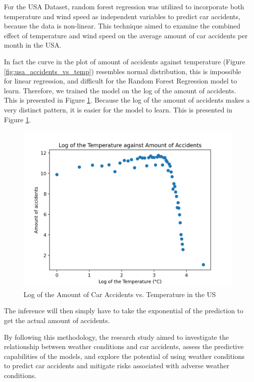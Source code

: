\documentclass{article}
\begin{document}
For the USA Dataset, random forest regression \cite{random_forest_regression} was utilized to incorporate both temperature and wind speed as independent variables to predict car accidents, because the data is non-linear. This technique aimed to examine the combined effect of temperature and wind speed on the average amount of car accidents per month in the USA.

In fact the curve in the plot of amount of accidents against temperature (Figure \ref{fig:usa_accidents_vs_temp}) resembles normal distribution, this is impossible for linear regression, and difficult for the Random Forest Regression model to learn. Therefore, we trained the model on the log of the amount of accidents. This is presented in Figure \ref{fig:usa_log_accidents_vs_temp}. Because the log of the amount of accidents makes a very distinct pattern, it is easier for the model to learn. This is presented in Figure \ref{fig:usa_log_accidents_vs_temp}.

\begin{figure}[h!]
    \centering
    \includegraphics[scale=0.5]{../figures/highres/log_temperature_against_amount_of_accidents.png}
    \caption{Log of the Amount of Car Accidents vs. Temperature in the US}
    \label{fig:usa_log_accidents_vs_temp}
\end{figure}

The inference will then simply have to take the exponential of the prediction to get the actual amount of accidents.

By following this methodology, the research study aimed to investigate the relationship between weather conditions and car accidents, assess the predictive capabilities of the models, and explore the potential of using weather conditions to predict car accidents and mitigate risks associated with adverse weather conditions.
\end{document}
